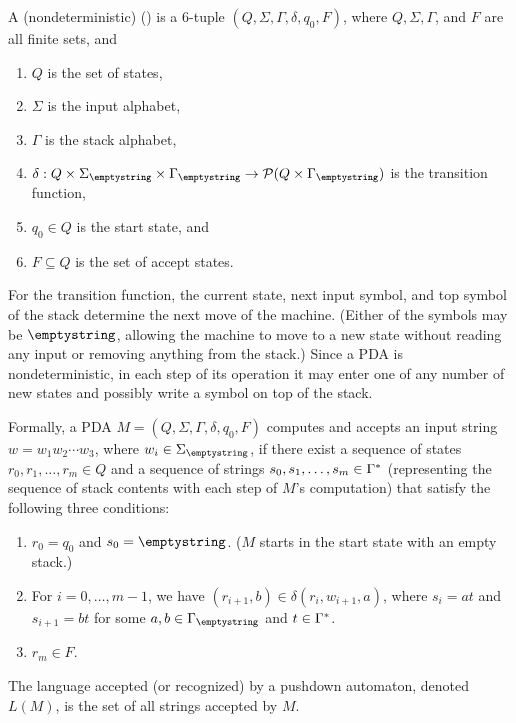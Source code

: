 \documentclass[twoside,letterpaper,openany]{book}
\begin{document}

\begin{defn}
A (nondeterministic)  () is a 6-tuple $(Q, \Sigma, \Gamma, \delta, q_0, F)$, where $Q, \Sigma, \Gamma$, and $F$ are all finite sets, and
\begin{enumerate}
\item $Q$ is the set of states,
\item $\Sigma$ is the input alphabet,
\item $\Gamma$ is the stack alphabet,
\item $\delta: Q \times \Sigma_\emptystring \times \Gamma_\emptystring \rightarrow \powerset{Q \times \Gamma_\emptystring}$ is the transition function,
\item $q_0 \in Q$ is the start state, and
\item $F \subseteq Q$ is the set of accept states.
\end{enumerate}

For the transition function, the current state, next input symbol, and top symbol of the stack determine the next move of the machine. (Either of the symbols may be $\emptystring$, allowing the machine to move to a new state without reading any input or removing anything from the stack.) Since a PDA is nondeterministic, in each step of its operation it may enter one of any number of new states and possibly write a symbol on top of the stack.

Formally, a PDA $M = (Q, \Sigma, \Gamma, \delta, q_0, F)$ computes and accepts an input string $w = w_1w_2\cdots w_3$, where $w_i \in \Sigma_\emptystring$, if there exist a sequence of states $r_0, r_1, \ldots, r_m \in Q$ and a sequence of strings $s_0, s_1, \ldots, s_m \in \Gamma^{*}$ (representing the sequence of stack contents with each step of $M$'s computation) that satisfy the following three conditions:
\begin{enumerate}
\item $r_0 = q_0$ and $s_0 = \emptystring$. ($M$ starts in the start state with an empty stack.)
\item For $i = 0, \ldots, m-1$, we have $(r_{i+1}, b) \in \delta(r_i, w_{i+1}, a)$, where $s_i = at$ and $s_{i+1} = bt$ for some $a, b \in \Gamma_\emptystring$ and $t \in \Gamma^{*}$. 
\item $r_m \in F$.
\end{enumerate}

The language accepted (or recognized) by a pushdown automaton, denoted $L(M)$, is the set of all strings accepted by $M$.

\end{defn}
\end{document}
